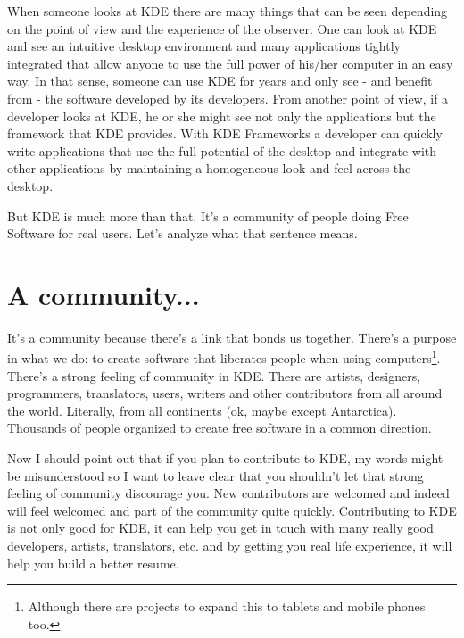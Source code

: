 
\noindent{}When someone looks at KDE there are many things that can be seen depending on the point of view and the experience of the observer. One can look at KDE and see an intuitive desktop environment and many applications tightly integrated that allow anyone to use the full power of his/her computer in an easy way. In that sense, someone can use KDE for years and only see - and benefit from - the software developed by its developers. From another point of view, if a developer looks at KDE, he or she might see not only the applications but the framework that KDE provides. With KDE Frameworks a developer can quickly write applications that use the full potential of the desktop and integrate with other applications by maintaining a homogeneous look and feel across the desktop. 

But KDE is much more than that. It's a community of people doing Free Software for real users. Let's analyze what that sentence means.

\section*{A community...}
It's a community because there's a link that bonds us together. There's a purpose in what we do: to create software that liberates people when using computers\footnote{Although there are projects to expand this to tablets and mobile phones too.}. There's a strong feeling of community in KDE. There are artists, designers, programmers, translators, users, writers and other contributors from all around the world. Literally, from all continents (ok, maybe except Antarctica). Thousands of people organized to create free software in a common direction.

Now I should point out that if you plan to contribute to KDE, my words might be misunderstood so I want to leave clear that you shouldn't let that strong feeling of community discourage you. New contributors are welcomed and indeed will feel welcomed and part of the community quite quickly. Contributing to KDE is not only good for KDE, it can help you get in touch with many really good developers, artists, translators, etc. and by getting you real life experience, it will help you build a better resume.

